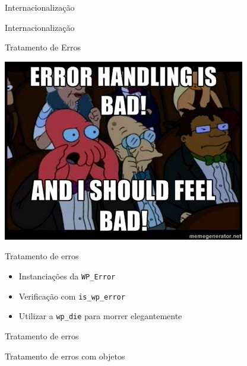 \documentclass{beamer}
\begin{document}
\begin{frame}{Internacionalização}
  
\end{frame}

\begin{frame}{Internacionalização}
  
\end{frame}

\begin{frame}{Tratamento de Erros}
\begin{center}
  \includegraphics[height=0.8\textheight]{./img/error-handling.jpg}
\end{center}
\end{frame}

\begin{frame}{Tratamento de erros}
\begin{itemize}
  \pause \item Instanciações da \texttt{WP\_Error}
  \pause \item Verificação com \texttt{is\_wp\_error}
  \pause \item Utilizar a \texttt{wp\_die} para morrer elegantemente
\end{itemize}
\end{frame}

\begin{frame}{Tratamento de erros}
  
\end{frame}

\begin{frame}{Tratamento de erros com objetos}
  
\end{frame}
\end{document}
